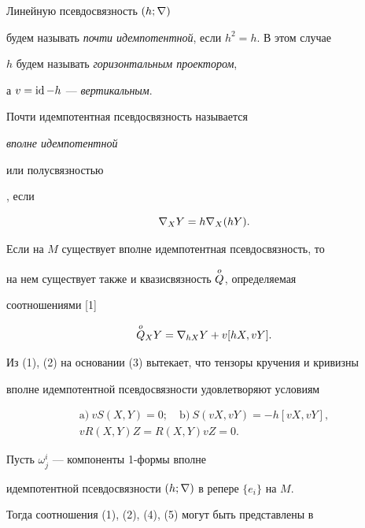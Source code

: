 \begin{defn}


Линейную псевдосвязность $(h; \nb)$


будем называть {\it почти идемпотентной}, если $h^2=h$. В этом случае


$h$ будем называть {\it горизонтальным проектором},


а $v=\id - h$ --- {\it вертикальным}.


Почти идемпотентная псевдосвязность называется {\it вполне идемпотентной


или полусвязностью}, если


\begin{equation}


\nb_{X} Y=h \nb_{X} (hY).


\end{equation}


\end{defn}





Если на $M$ существует вполне идемпотентная псевдосвязность, то


на нем существует также и квазисвязность $\os Q o$, определяемая


соотношениями [1]


$$


\os Q{o}_{X} Y=\nb_{hX}Y+v[hX,vY].


$$


Из (1), (2) на основании (3) вытекает, что тензоры кручения и кривизны


вполне идемпотентной псевдосвязности удовлетворяют условиям


\begin{gather}


\mathrm a) \ vS(X, Y)=0; \quad \mathrm b)


\ S (vX, vY)=-h [vX, vY], \\


vR (X, Y) Z=R (X, Y) vZ=0.


\end{gather}





Пусть $\omega_j^i$ --- компоненты 1-формы вполне


идемпотентной псевдосвязности $(h; \nb)$ в репере $\{e_{i}\}$ на $M$.


Тогда соотношения (1), (2), (4), (5) могут быть представлены в


